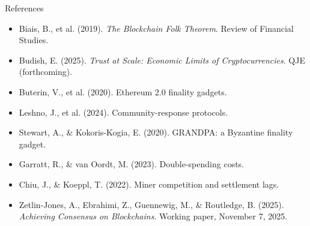 \documentclass[aspectratio=169, 12pt]{beamer}
\begin{document}
\begin{frame}{References}
    \small
    \begin{itemize}
        \item Biais, B., et al. (2019). \emph{The Blockchain Folk Theorem}. Review of Financial Studies.
        \item Budish, E. (2025). \emph{Trust at Scale: Economic Limits of Cryptocurrencies}. QJE (forthcoming).
        \item Buterin, V., et al. (2020). Ethereum 2.0 finality gadgets.
        \item Leshno, J., et al. (2024). Community-response protocols.
        \item Stewart, A., \& Kokoris-Kogia, E. (2020). GRANDPA: a Byzantine finality gadget.
        \item Garratt, R., \& van Oordt, M. (2023). Double-spending costs.
        \item Chiu, J., \& Koeppl, T. (2022). Miner competition and settlement lags.
        \item {Zetlin-Jones, A., Ebrahimi, Z., Guennewig, M., \& Routledge, B. (2025).} 
\emph{Achieving Consensus on Blockchains}. 
Working paper, November 7, 2025.
    \end{itemize}
\end{frame}
\end{document}
